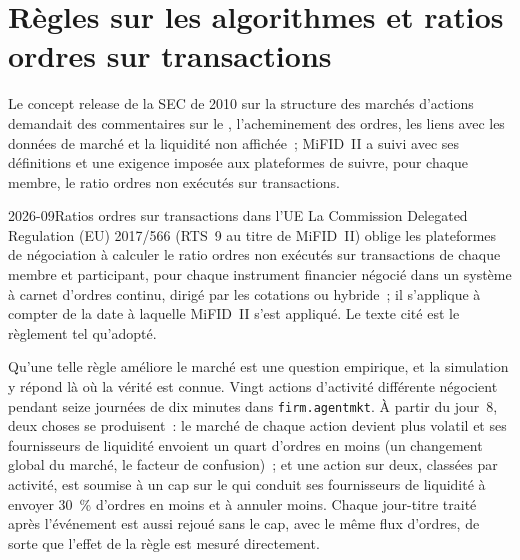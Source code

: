 \section{Règles sur les algorithmes et ratios ordres sur transactions}

Le concept release de la SEC de 2010 sur la structure des marchés d'actions demandait des commentaires sur le , l'acheminement des ordres, les liens avec les données de marché et
la liquidité non affichée~; MiFID~II a suivi avec ses définitions et une exigence imposée aux plateformes de suivre, pour chaque membre, le
ratio ordres non exécutés sur transactions.

\begin{dated}{2026-09}{Ratios ordres sur transactions dans l'UE}\label{dat:mx:market-quality-and-regulation:otr}
La Commission Delegated Regulation (EU) 2017/566 (RTS~9 au titre de MiFID~II) oblige les plateformes de négociation à calculer le ratio ordres non exécutés sur transactions
de chaque membre et participant, pour chaque instrument financier négocié dans un système à carnet d'ordres continu, dirigé par les cotations ou hybride~; il s'applique à compter de la
date à laquelle MiFID~II s'est appliqué. Le texte cité est le règlement tel qu'adopté.
\end{dated}

Qu'une telle règle améliore le marché est une question empirique, et la simulation y répond là où la vérité est connue. Vingt actions
d'activité différente négocient pendant seize journées de dix minutes dans \texttt{firm.agentmkt}. À partir du jour~8, deux choses se produisent~: le marché de chaque action devient plus
volatil et ses fournisseurs de liquidité envoient un quart d'ordres en moins (un changement global du marché, le facteur de confusion)~; et une action sur deux, classées par activité,
est soumise à un cap sur le  qui conduit ses fournisseurs de liquidité à envoyer 30~\% d'ordres en moins et à annuler moins. Chaque jour-titre traité après l'événement est
aussi rejoué sans le cap, avec le même flux d'ordres, de sorte que l'effet de la règle est mesuré directement.

